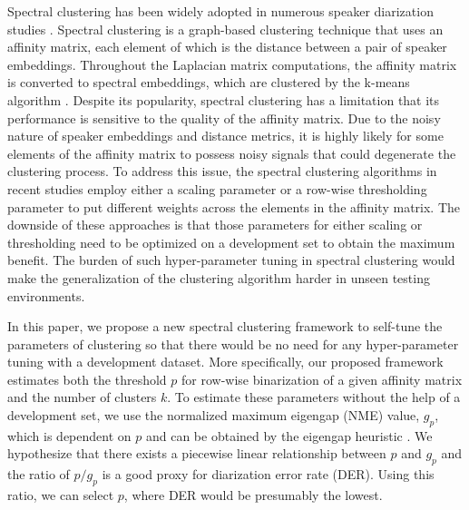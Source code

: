 \documentclass[journal]{IEEEtran}
\begin{document}
Spectral clustering has been widely adopted in numerous speaker diarization studies \cite{ning2006spectral, luque2012, shum2012use, shum2013unsupervised, wang2018speaker, qingjian2019}. Spectral clustering is a graph-based clustering technique that uses an affinity matrix, each element of which is the distance between a pair of speaker embeddings. Throughout the Laplacian matrix computations, the affinity matrix is converted to spectral embeddings, which are clustered by the k-means algorithm \cite{lloyd1982least}. Despite its popularity, spectral clustering has a limitation that its performance is sensitive to the quality of the affinity matrix. Due to the noisy nature of speaker embeddings and distance metrics, it is highly likely for some elements of the affinity matrix to possess noisy signals that could degenerate the clustering process. To address this issue, the spectral clustering algorithms in recent studies employ either a scaling parameter \cite{ning2006spectral, shum2012use, luque2012} or a row-wise thresholding parameter \cite{wang2018speaker} to put different weights across the elements in the affinity matrix. The downside of these approaches is that those parameters for either scaling or thresholding need to be optimized on a development set to obtain the maximum benefit. The burden of such hyper-parameter tuning in spectral clustering would make the generalization of the clustering algorithm harder in unseen testing environments. 

In this paper, we propose a new spectral clustering framework to self-tune the parameters of clustering so that there would be no need for any hyper-parameter tuning with a development dataset. More specifically, our proposed framework estimates both the threshold $p$ for row-wise binarization of a given affinity matrix and the number of clusters $k$. To estimate these parameters without the help of a development set, we use the normalized maximum eigengap (NME) value,  $g_p$, which is dependent on $p$ and can be obtained by the eigengap heuristic \cite{von2007tutorial}. We hypothesize that there exists a piecewise linear relationship between $p$ and $g_p$ and the ratio of $p / g_p$ is a good proxy for diarization error rate (DER). Using this ratio, we can select $p$, where DER would be presumably the lowest. 
\end{document}
